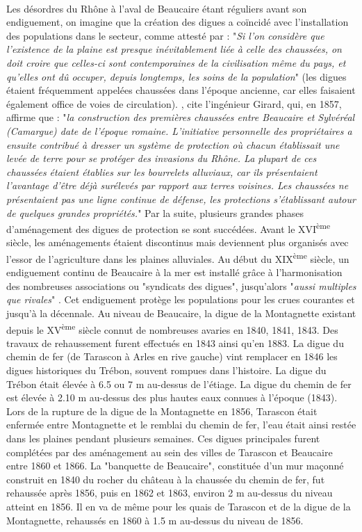 \documentclass[11pt]{article}
\begin{document}
		\paragraph{} Les désordres du Rhône à l'aval de Beaucaire étant réguliers avant son endiguement, on imagine que la création des digues a coïncidé avec l'installation des populations dans le secteur, comme attesté par \citet{surell_memoire_1847} : "\textit{Si l'on considère que l'existence de la plaine est presque inévitablement liée à celle des chaussées, on doit croire que celles-ci sont contemporaines de la civilisation même du pays, et qu'elles ont dû occuper, depuis longtemps, les soins de la population}" (les digues étaient fréquemment appelées chaussées dans l'époque ancienne, car elles faisaient également office de voies de circulation). \citet{mejean_etude_2017}, cite l'ingénieur Girard, qui, en 1857, affirme que : "\textit{la construction des premières chaussées entre Beaucaire et Sylvéréal (Camargue) date de l'époque romaine. L'initiative personnelle des propriétaires a ensuite contribué à dresser un système de protection où chacun établissait une levée de terre pour se protéger des invasions du Rhône. La plupart de ces chaussées étaient établies sur les bourrelets alluviaux, car ils présentaient l'avantage d'être déjà surélevés par rapport aux terres voisines. Les chaussées ne présentaient pas une ligne continue de défense, les protections s'établissant autour de quelques grandes propriétés.}" Par la suite, plusieurs grandes phases d'aménagement des digues de protection se sont succédées. Avant le XVI\textsuperscript{ème} siècle, les aménagements étaient discontinus mais deviennent plus organisés avec l'essor de l'agriculture dans les plaines alluviales. Au début du XIX\textsuperscript{ème} siècle, un endiguement continu de Beaucaire à la mer est installé grâce à l'harmonisation des nombreuses associations ou "syndicats des digues", jusqu'alors "\textit{aussi multiples que rivales}" \citep{pichard_sept_2014}. Cet endiguement protège les populations pour les crues courantes et jusqu'à la décennale. Au niveau de Beaucaire, la digue de la Montagnette existant depuis le XV\textsuperscript{ème} siècle connut de nombreuses avaries en 1840, 1841, 1843. Des travaux de rehaussement furent effectués en 1843 ainsi qu'en 1883. La digue du chemin de fer (de Tarascon à Arles en rive gauche) vint remplacer en 1846 les digues historiques du Trébon, souvent rompues dans l'histoire. La digue du Trébon était élevée à 6.5 ou 7 m au-dessus de l'étiage. La digue du chemin de fer est élevée à 2.10 m au-dessus des plus hautes eaux connues à l'époque (1843). Lors de la rupture de la digue de la Montagnette en 1856, Tarascon était enfermée entre Montagnette et le remblai du chemin de fer, l'eau était ainsi restée dans les plaines pendant plusieurs semaines. Ces digues principales furent complétées par des aménagement au sein des villes de Tarascon et Beaucaire entre 1860 et 1866. La "banquette de Beaucaire", constituée d'un mur maçonné construit en 1840 du rocher du château à la chaussée du chemin de fer, fut rehaussée après 1856, puis en 1862 et 1863, environ 2 m au-dessus du niveau atteint en 1856. Il en va de même pour les quais de Tarascon et de la digue de la Montagnette, rehaussés en 1860 à 1.5 m au-dessus du niveau de 1856.
		
\end{document}
